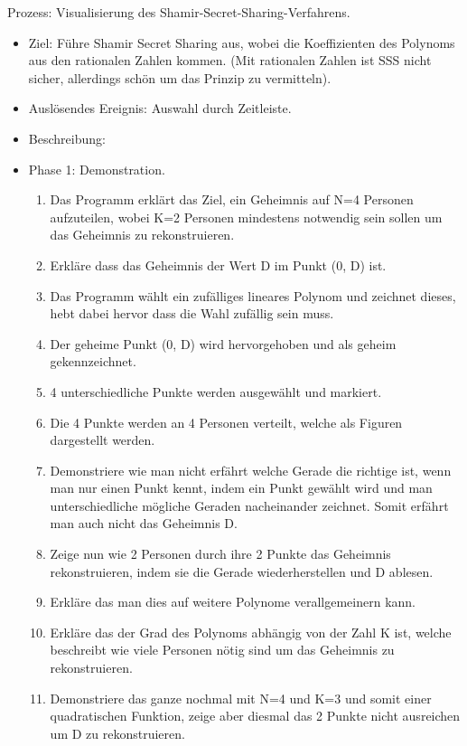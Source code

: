 \documentclass{article}
\begin{document}
\begin{FA}[start=900]
 \item Prozess: Visualisierung des Shamir-Secret-Sharing-Verfahrens.
\end{FA}
\begin{itemize}[label={}]

 \item Ziel: Führe Shamir Secret Sharing aus, wobei die Koeffizienten des Polynoms 
aus den rationalen Zahlen kommen. (Mit rationalen Zahlen ist SSS nicht sicher, 
allerdings schön um das Prinzip zu vermitteln).

 \item Auslösendes Ereignis: Auswahl durch Zeitleiste.

 \item Beschreibung:

 \item Phase 1: Demonstration.

	\begin{enumerate}[]
     \item Das Programm erklärt das Ziel,
        ein Geheimnis auf N=4 Personen aufzuteilen,
        wobei K=2 Personen mindestens notwendig sein sollen um
        das Geheimnis zu rekonstruieren.
     \item Erkläre dass das Geheimnis der Wert
        D im Punkt (0, D) ist.
     \item Das Programm wählt ein zufälliges lineares Polynom
        und zeichnet dieses, hebt dabei hervor dass die Wahl
        zufällig sein muss.
     \item Der geheime Punkt (0, D)
        wird hervorgehoben
        und als geheim gekennzeichnet.
     \item 4 unterschiedliche Punkte werden ausgewählt
        und markiert.
     \item Die 4 Punkte werden an 4 Personen
        verteilt, welche als Figuren dargestellt
        werden.
     \item Demonstriere wie man nicht erfährt
        welche Gerade die richtige ist, wenn
        man nur einen Punkt kennt, indem
        ein Punkt gewählt wird und man
        unterschiedliche mögliche Geraden
        nacheinander zeichnet.
        Somit erfährt man auch nicht
        das Geheimnis D.
     \item Zeige nun wie 2 Personen
        durch ihre 2 Punkte das Geheimnis rekonstruieren,
        indem sie die Gerade wiederherstellen und D ablesen.
     \item Erkläre das man dies auf weitere Polynome
        verallgemeinern kann.
     \item Erkläre das der Grad des Polynoms
        abhängig von der Zahl K ist, welche
        beschreibt wie viele Personen nötig
        sind um das Geheimnis zu rekonstruieren.
     \item Demonstriere das ganze nochmal mit N=4
        und K=3 und somit einer quadratischen Funktion,
        zeige aber diesmal das 2 Punkte nicht ausreichen
        um D zu rekonstruieren.
	\end{enumerate}


\end{itemize}
\end{document}
